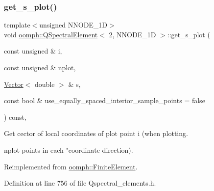 \subsubsection{\texorpdfstring{get\+\_\+s\+\_\+plot()}{get\_s\_plot()}}
{\footnotesize\ttfamily template$<$unsigned N\+N\+O\+D\+E\+\_\+1D$>$ \\
void \hyperlink{classoomph_1_1QSpectralElement}{oomph\+::\+Q\+Spectral\+Element}$<$ 2, N\+N\+O\+D\+E\+\_\+1D $>$\+::get\+\_\+s\+\_\+plot (\begin{DoxyParamCaption}\item[{const unsigned \&}]{i,  }\item[{const unsigned \&}]{nplot,  }\item[{\hyperlink{classoomph_1_1Vector}{Vector}$<$ double $>$ \&}]{s,  }\item[{const bool \&}]{use\+\_\+equally\+\_\+spaced\+\_\+interior\+\_\+sample\+\_\+points = {\ttfamily false} }\end{DoxyParamCaption}) const\hspace{0.3cm}{\ttfamily [inline]}, {\ttfamily [virtual]}}



Get cector of local coordinates of plot point i (when plotting. 

nplot points in each "coordinate direction). 

Reimplemented from \hyperlink{classoomph_1_1FiniteElement_a82da844fd3ebb2005842464cdc148a03}{oomph\+::\+Finite\+Element}.



Definition at line 756 of file Qspectral\+\_\+elements.\+h.

\mbox{\label{classoomph_1_1QSpectralElement_3_012_00_01NNODE__1D_01_4_a43e9825330e5e7c107a78a14fcace34d}} 
